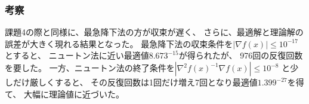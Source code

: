 \documentclass[a4j, titlepage]{jsarticle}
\numberwithin{equation}{section}
\begin{document}
        \subsubsection{考察}
            課題4の際と同様に、最急降下法の方が収束が遅く、
            さらに、最適解と理論解の誤差が大きく現れる結果となった。
            最急降下法の収束条件を$|\nabla f(x)| \leq 10^{-17}$とすると、
            ニュートン法に近い最適値$8.673^{-15}$が得られたが、
            976回の反復回数を要した。
            一方、ニュートン法の終了条件を$|\nabla^2f(x)^{-1}\nabla f(x)|\leq 10^{-8}$
            と少しだけ厳しくすると、
            その反復回数は1回だけ増え7回となり最適値$1.399^{-27}$を得て、
            大幅に理論値に近づいた。
    
\newpage
{}
\begin{thebibliography}{99}
\end{thebibliography}
\end{document}
